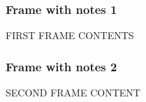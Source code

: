\documentclass{beamer}
\begin{document}
\NoHyper
\begin{frame}
\frametitle{Frame with notes 1}
FIRST FRAME CONTENTS
\end{frame}

\begin{frame}
\frametitle{Frame with notes 2}
SECOND FRAME CONTENT
\end{frame}
\endNoHyper
\end{document}
